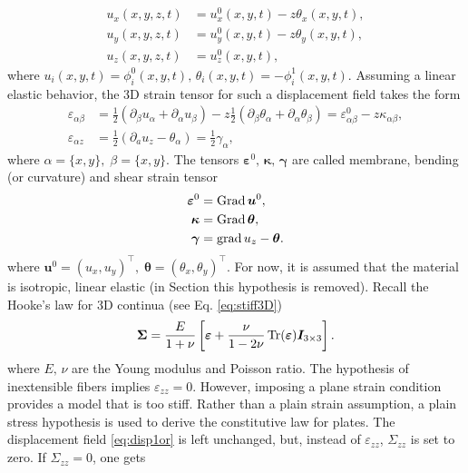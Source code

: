\begin{equation}\label{eq:disp1or}
\begin{aligned}
u_x(x,y,z,t) &= u_x^0(x,y,t) -z \theta_x(x,y,t), \\
u_y(x,y,z,t) &= u_y^0(x,y,t) -z \theta_y(x,y,t), \\
u_z(x,y,z,t) &= u_z^0(x,y,t), 
\end{aligned}
\end{equation}
where $u_i(x,y,t) = \phi_i^0(x,y,t), \, \theta_i(x,y,t) = -\phi_i^1(x,y,t)$. Assuming a linear elastic behavior, the 3D strain tensor for such a displacement field takes the form
\begin{align}
\varepsilon_{\alpha \beta} &= \frac{1}{2} \left(\partial_\beta u_\alpha + \partial_\alpha u_\beta \right) - z \frac{1}{2} \left(\partial_\beta \theta_\alpha + \partial_\alpha \theta_\beta \right) = {\varepsilon}^0_{\alpha \beta} - z \kappa_{\alpha \beta}, \label{eq:eps_inplane}\\
\varepsilon_{\alpha z} &= \frac{1}{2} \left(\partial_a u_z - \theta_\alpha \right) = \frac{1}{2} \gamma_\alpha,
\end{align}
where $\alpha=\{x,y\}, \; \beta=\{x,y\}$. The tensors $\bm{\varepsilon}^0,\, \bm{\kappa},\, \bm{\gamma}$ are called membrane, bending (or curvature) and shear strain tensor
\begin{align}
\bm{\varepsilon}^0 &= \operatorname*{Grad} \bm{u}^0, \label{eq:eps0} \\
\bm{\kappa} &= \operatorname*{Grad} \bm{\theta}, \label{eq:kappa}  \\
\bm{\gamma} &= \operatorname*{grad} u_z - \bm{\theta}. \label{eq:gamma}
\end{align}
where $\bm{u}^0 = (u_x, u_y)^\top, \; \bm{\theta} = (\theta_x, \theta_y)^\top$. For now, it is assumed that the material is isotropic, linear elastic (in Section  this hypothesis is removed). Recall the Hooke's law for 3D continua (see Eq. \eqref{eq:stiff3D})
\begin{equation*}
\bm{\Sigma} = \frac{E}{1+\nu} \left[\bm{\varepsilon} + \frac{\nu}{1-2\nu} \operatorname{Tr}(\bm{\varepsilon})\bm{I}_{3\times 3} \right].
\end{equation*}
where $E,\, \nu$ are the Young modulus and Poisson ratio. The hypothesis of inextensible fibers implies $\varepsilon_{zz}=0$. However, imposing a plane strain condition provides a model that is too stiff. Rather than a plain strain assumption, a plain stress hypothesis is used to derive the constitutive law for plates. The displacement field \eqref{eq:disp1or} is left unchanged, but, instead of $\varepsilon_{zz}$, $\Sigma_{zz}$ is set to zero. If $\Sigma_{zz}=0$, one gets

